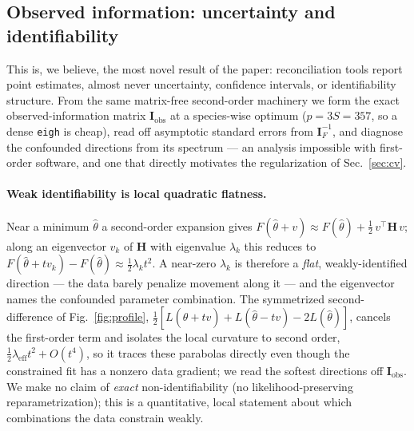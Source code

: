 \documentclass[11pt]{article}
\newcommand{\Hess}{\mathbf{H}}
\newcommand{\Fish}{\mathbf{I}}
\begin{document}
\subsection{Observed information: uncertainty and identifiability}
\label{sec:fisher}
This is, we believe, the most novel result of the paper: reconciliation tools
report point estimates, almost never uncertainty, confidence intervals, or
identifiability structure. From the same matrix-free second-order machinery we
form the exact observed-information matrix $\Fish_{\mathrm{obs}}$ at a species-wise
optimum ($p=3S=357$, so a dense \texttt{eigh} is cheap), read off asymptotic
standard errors from $\Fish_F^{-1}$, and diagnose the confounded directions from
its spectrum --- an analysis impossible with first-order software, and one that
directly motivates the regularization of Sec.~\ref{sec:cv}.

\paragraph{Weak identifiability is local quadratic flatness.} Near a minimum
$\hat\theta$ a second-order expansion gives $F(\hat\theta+v)\approx
F(\hat\theta)+\tfrac12\,v^\top\Hess\,v$; along an eigenvector $v_k$ of $\Hess$ with
eigenvalue $\lambda_k$ this reduces to $F(\hat\theta+t v_k)-F(\hat\theta)\approx
\tfrac12\lambda_k t^2$. A near-zero $\lambda_k$ is therefore a \emph{flat},
weakly-identified direction --- the data barely penalize movement along it --- and the
eigenvector names the confounded parameter combination. The symmetrized
second-difference of Fig.~\ref{fig:profile}, $\tfrac12[L(\hat\theta{+}t v)+
L(\hat\theta{-}t v)-2L(\hat\theta)]$, cancels the first-order term and isolates the local
curvature to second order, $\tfrac12\lambda_{\mathrm{eff}}t^2+O(t^4)$, so it traces these parabolas directly even though
the constrained fit has a nonzero data gradient; we read the softest directions off
$\Fish_{\mathrm{obs}}$. We
make no claim of \emph{exact} non-identifiability (no likelihood-preserving
reparametrization); this is a quantitative, local statement about which combinations
the data constrain weakly.
\end{document}
